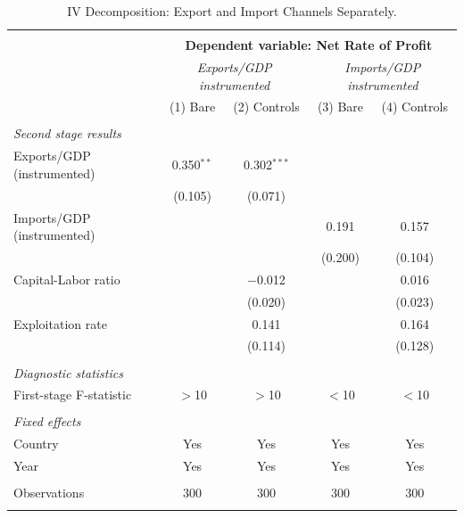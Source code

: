 \documentclass[10pt]{article}
\begin{document}
\begin{table}[!htbp]
  \centering
  \small
  \caption{IV Decomposition: Export and Import Channels Separately.}
  \label{table:iv_exp_imp}
  \begin{tabular}{@{\extracolsep{5pt}}lcccc}
  \\[-1.8ex]\hline
  \hline \\[-1.8ex]
  & \multicolumn{4}{c}{\textbf{Dependent variable: Net Rate of Profit}} \\
  & \multicolumn{2}{c}{\textit{Exports/GDP instrumented}} & \multicolumn{2}{c}{\textit{Imports/GDP instrumented}} \\
  & (1) Bare & (2) Controls & (3) Bare & (4) Controls \\
  \hline \\[-1.8ex]
  \textit{Second stage results} & & & & \\
  \quad Exports/GDP (instrumented) & 0.350$^{**}$ & 0.302$^{***}$ & & \\
  & (0.105) & (0.071) & & \\
  \quad Imports/GDP (instrumented) & & & 0.191 & 0.157 \\
  & & & (0.200) & (0.104) \\
  \quad Capital-Labor ratio & & $-$0.012 & & 0.016 \\
  & & (0.020) & & (0.023) \\
  \quad Exploitation rate & & 0.141 & & 0.164 \\
  & & (0.114) & & (0.128) \\
  \\
  \textit{Diagnostic statistics} & & & & \\
  \quad First-stage F-statistic & $>$10 & $>$10 & $<$10 & $<$10 \\
  \\
  \textit{Fixed effects} & & & & \\
  \quad Country & Yes & Yes & Yes & Yes \\
  \quad Year & Yes & Yes & Yes & Yes \\
  \\
  Observations & 300 & 300 & 300 & 300 \\
  \hline
  \hline \\[-1.8ex]
  \end{tabular}
  \begin{minipage}{\textwidth}
  \footnotesize

\end{minipage}
\end{table}
\end{document}
